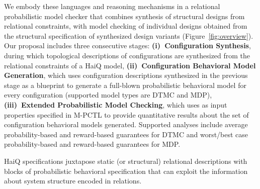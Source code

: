 \documentclass[10pt,journal,compsoc]{IEEEtran}
\begin{document}
We embody these languages and reasoning mechanisms in a relational probabilistic model checker that combines synthesis of structural designs from relational constraints, with model checking of individual designs obtained from the structural specification of synthesized design variants (Figure~\ref{fig:overview}). 
Our proposal includes three consecutive stages:
{\bf (i)~Configuration Synthesis}, during which topological descriptions of configurations are synthesized from the relational constraints of a {\sf HaiQ} model,
{\bf (ii)~Configuration Behavioral Model Generation}, which uses configuration descriptions synthesized in the previous stage as a blueprint to generate a full-blown probabilistic behavioral model for every configuration (supported model types are DTMC and MDP),
{\bf (iii)~Extended Probabilistic Model Checking}, which uses as input properties specified in M-PCTL to provide quantitative results about the set of configuration behavioral models generated. Supported analyses include average probability-based and reward-based guarantees for DTMC and worst/best case probability-based and reward-based guarantees for MDP.



\smallskip
{} 
{\sf HaiQ} specifications juxtapose static (or structural) relational descriptions with blocks of probabilistic behavioral specification that can exploit the information about system structure encoded in relations. 
\end{document}
